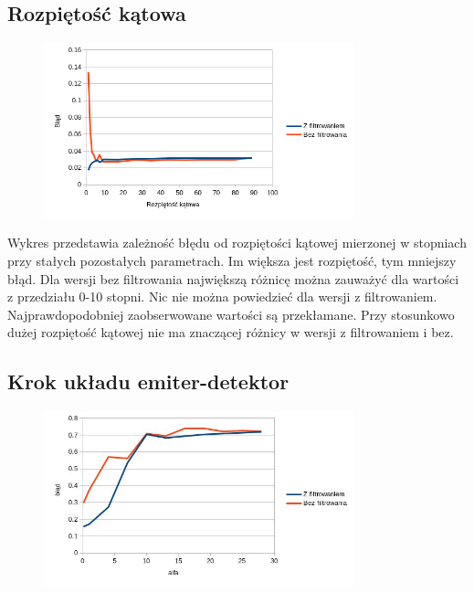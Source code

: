 \documentclass{article}
\begin{document}
\subsection{Rozpiętość kątowa}
\begin{figure}[H]
\begin{center}
\includegraphics[width=0.8\textwidth]{./width.png}
\end{center}
\end{figure}

Wykres przedstawia zależność błędu od rozpiętości kątowej mierzonej w stopniach przy stałych pozostałych parametrach. Im większa jest rozpiętość, tym mniejszy błąd. Dla wersji bez filtrowania największą różnicę można zauważyć dla wartości z przedziału 0-10 stopni. Nic nie można powiedzieć dla wersji z filtrowaniem. Najprawdopodobniej zaobserwowane wartości są przekłamane. Przy stosunkowo dużej rozpiętość kątowej nie ma znaczącej różnicy w wersji z filtrowaniem i bez. 

\subsection{Krok układu emiter-detektor}
\begin{figure}[H]
\begin{center}
\includegraphics[width=0.8\textwidth]{./alpha.jpg}
\end{center}
\end{figure}
\end{document}
